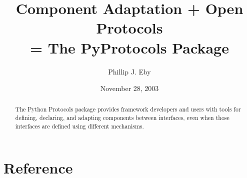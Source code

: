 \documentclass{manual}
\title{Component Adaptation + Open Protocols \\ = The PyProtocols Package}
\author{Phillip J. Eby}
\date{November 28, 2003}       %
\begin{document}
\maketitle


%

\begin{abstract}

\noindent

The Python Protocols package provides framework developers and users with
tools for defining, declaring, and adapting components between interfaces,
even when those interfaces are defined using different mechanisms.

\end{abstract}

\tableofcontents

\chapter{Reference}













%
%
%
\renewcommand{\indexname}{Module Index}

\renewcommand{\indexname}{Index}
\end{document}
